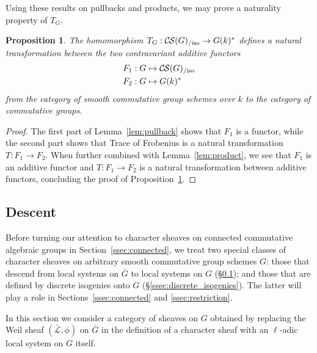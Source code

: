 \documentclass[10pt]{amsart}
\theoremstyle{plain}
\newtheorem{proposition}[theorem]{Proposition}
\theoremstyle{definition}
\theoremstyle{remark}
\newcommand{\Fq}{k}
\newcommand{\TrFrob}[1]{T_{#1}}
\newcommand{\gcs}[1]{{\mathcal{\bar #1}}}
\newcommand{\CS}{{\mathcal{C\hskip-0.8pt S}}}
\newcommand{\CSiso}[1]{\CS(#1)_{/\text{iso}}}
\newcommand{\bG}{\bar{G}}
\begin{document}
Using these results on pullbacks and products, we may prove a naturality property of $\TrFrob{G}$.

\begin{proposition}\label{prop:functorialG}
The homomorphism $\TrFrob{G} : \CSiso{G} \to G(\Fq)^*$ defines a natural transformation
between the two contravariant additive functors
\begin{align*}
F_1 : G &\mapsto \CSiso{G} \\
F_2 : G &\mapsto G(\Fq)^*
\end{align*}
from the category of smooth commutative group schemes over $\Fq$ to the category of commutative groups.
\end{proposition}

\begin{proof}
The first part of Lemma~\ref{lem:pullback} shows that $F_1$ is a functor,
while the second part shows that Trace of Frobenius is a natural transformation
$T: F_1 \to F_2$. When further combined with Lemma~\ref{lem:product},
we see that $F_1$ is an additive functor and $T: F_1 \to F_2$ is a natural
transformation between additive functors,
concluding the proof of Proposition~\ref{prop:functorialG}.
\end{proof}


\subsection{Descent}\label{ssec:descentG}

Before turning our attention to character sheaves on connected commutative algebraic groups in Section~\ref{ssec:connected}, we treat two special classes of character sheaves on arbitrary smooth commutative group schemes $G$: those that descend from local systems on $\bG$ to local systems on $G$ (\S \ref{ssec:descentG}); and those that are defined by discrete isogenies onto $G$ (\S \ref{ssec:discrete_isogenies}). The latter will play a role in Sections~\ref{ssec:connected} and \ref{ssec:restriction}.

In this section we consider a category of sheaves on $G$ obtained by
replacing the Weil sheaf $(\gcs{L}, \phi)$ on $\bG$ in the definition of a character sheaf with an $\ell$-adic local system on $G$ itself.
\end{document}
